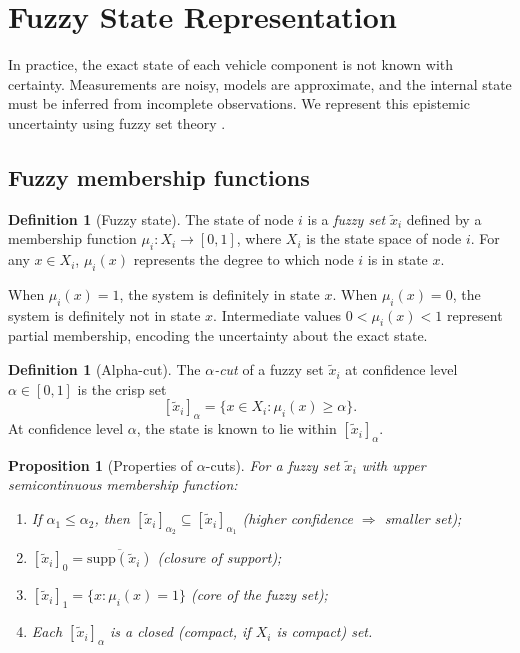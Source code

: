 \documentclass[twocolumn,10pt,a4paper]{article}
\newtheorem{proposition}[theorem]{Proposition}
\theoremstyle{definition}
\newtheorem{definition}[theorem]{Definition}
\theoremstyle{remark}
\newcommand{\fuzzy}[1]{\widetilde{#1}}
\begin{document}
\section{Fuzzy State Representation}\label{sec:fuzzy}

In practice, the exact state of each vehicle component is not known with certainty. Measurements are noisy, models are approximate, and the internal state must be inferred from incomplete observations. We represent this epistemic uncertainty using fuzzy set theory \citep{Zadeh1965}.

\subsection{Fuzzy membership functions}

\begin{definition}[Fuzzy state]\label{def:fuzzy_state}
The state of node $i$ is a \emph{fuzzy set} $\fuzzy{x}_i$ defined by a membership function $\mu_i : X_i \to [0, 1]$, where $X_i$ is the state space of node $i$. For any $x \in X_i$, $\mu_i(x)$ represents the degree to which node $i$ is in state $x$.
\end{definition}

When $\mu_i(x) = 1$, the system is definitely in state $x$. When $\mu_i(x) = 0$, the system is definitely not in state $x$. Intermediate values $0 < \mu_i(x) < 1$ represent partial membership, encoding the uncertainty about the exact state.

\begin{definition}[Alpha-cut]\label{def:alpha_cut}
The \emph{$\alpha$-cut} of a fuzzy set $\fuzzy{x}_i$ at confidence level $\alpha \in [0, 1]$ is the crisp set
\begin{equation}\label{eq:alpha_cut}
[\fuzzy{x}_i]_\alpha = \{x \in X_i : \mu_i(x) \geq \alpha\}.
\end{equation}
At confidence level $\alpha$, the state is known to lie within $[\fuzzy{x}_i]_\alpha$.
\end{definition}

\begin{proposition}[Properties of $\alpha$-cuts]\label{prop:alpha_cuts}
For a fuzzy set $\fuzzy{x}_i$ with upper semicontinuous membership function:
\begin{enumerate}[label=(\roman*)]
\item If $\alpha_1 \leq \alpha_2$, then $[\fuzzy{x}_i]_{\alpha_2} \subseteq [\fuzzy{x}_i]_{\alpha_1}$ (higher confidence $\Rightarrow$ smaller set);
\item $[\fuzzy{x}_i]_0 = \overline{\mathrm{supp}(\fuzzy{x}_i)}$ (closure of support);
\item $[\fuzzy{x}_i]_1 = \{x : \mu_i(x) = 1\}$ (core of the fuzzy set);
\item Each $[\fuzzy{x}_i]_\alpha$ is a closed (compact, if $X_i$ is compact) set.
\end{enumerate}
\end{proposition}
\end{document}
